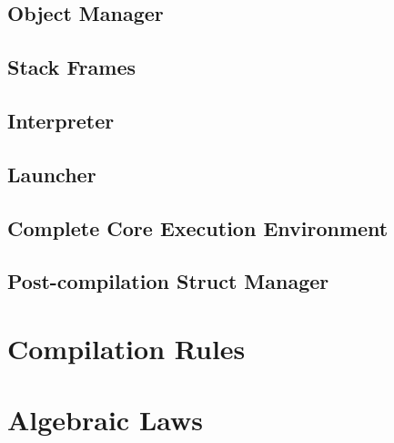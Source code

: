\documentclass[a4paper,11pt]{report}
\begin{document}




\section{Object Manager}
\label{object-manager-appendix}


\section{Stack Frames}


\section{Interpreter}
\label{interpreter-appendix}





\section{Launcher}
\label{launcher-appendix}


\section{Complete Core Execution Environment}


\section{Post-compilation Struct Manager}
\label{struct-manager-appendix}


\chapter{Compilation Rules}
\label{compilation-rules-appendix}



\chapter{Algebraic Laws}

\end{document}
